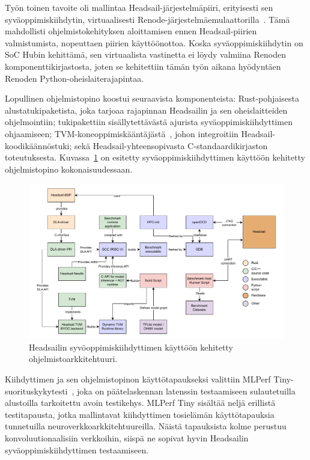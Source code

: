 \documentclass[12pt,a4paper,finnish
]{tunithesis}
\begin{document}
Työn toinen tavoite oli mallintaa Headsail-järjestelmäpiiri, erityisesti sen sy\-vä\-op\-pi\-mis\-kiih\-dy\-tin, virtuaalisesti Renode-järjestelmäemulaattorilla~\cite{renode}.
Tämä mahdollisti ohjelmistokehityksen aloittamisen ennen Headsail-piirien valmistumista, nopeuttaen piirien käyt\-töön\-ot\-to\-a.
Koska syväoppimiskiihdytin on SoC Hubin kehittämä, sen virtuaalista vastinetta ei löydy valmiina Renoden komponenttikirjastosta, joten se kehitettiin tämän työn aikana hyödyntäen Renoden Python-oheislaiterajapintaa.

Lopullinen ohjelmistopino koostui seuraavista komponenteista: Rust-pohjaisesta alustatukipaketista, joka tarjoaa rajapinnan Headsailin ja sen oheislaitteiden ohjelmointiin; tukipakettiin sisällytettävästä ajurista syväoppimiskiihdyttimen ohjaamiseen; TVM-koneoppimiskääntäjästä~\cite{TVM}, johon integroitiin Headsail-koo\-di\-kään\-nös\-tu\-ki; sekä Headsail-yhteensopivasta C-standaardikirjaston toteutuksesta.
Kuvassa~\ref{fig:architecture} on esitetty syväoppimiskiihdyttimen käyttöön kehitetty ohjelmistopino kokonaisuudessaan.

\begin{figure}
\centering
\includegraphics[width=\linewidth]{../thesis/img/dla-architecture-new.pdf}
\caption{Headsailin syvöoppimiskiihdyttimen käyttöön kehitetty ohjelmistoarkkitehtuuri.}
\label{fig:architecture}
\end{figure}

Kiihdyttimen ja sen ohjelmistopinon käyttötapaukseksi valittiin MLPerf Tiny-suorituskykytesti~\cite{banbury_mlperf_2021}, joka on päätelaskennan latenssin testaamiseen sulautetuilla alustoilla tarkoitettu avoin testikehys.
MLPerf Tiny sisältää neljä erillistä testitapausta, jotka mallintavat kiihdyttimen tosielämän käyttötapauksia tunnetuilla neuroverkkoarkkitehtuureilla.
Näistä tapauksista kolme perustuu konvoluutionaalisiin verkkoihin, siispä ne sopivat hyvin Headsailin syväoppimiskiihdyttimen testaamiseen.
\end{document}
